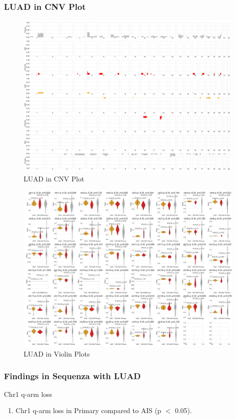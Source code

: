 \documentclass{beamer}
\begin{document}
    \begin{frame}[allowframebreaks]
        \frametitle{LUAD in CNV Plot}

        \begin{figure}
            \includegraphics[width=0.6 \linewidth]{figures/Sequenza/BWA-simple-ADC.pdf}
            \caption{LUAD in CNV Plot}
        \end{figure}

        \begin{figure}
            \includegraphics[width=0.8 \linewidth]{figures/Sequenza/BWA-violin-ADC.pdf}
            \caption{LUAD in Violin Plots}
        \end{figure}
    \end{frame}

    \begin{frame}[allowframebreaks]
        \frametitle{Findings in Sequenza with LUAD}

        \begin{block}{Chr1 q-arm loss}
            \begin{enumerate}
                \item Chr1 q-arm loss in Primary compared to AIS (p $<$ 0.05).
            \end{enumerate}

            \begin{table}
                \caption{CGC Tier1 genes in Chr1 q-arm}
                \resizebox{\linewidth}{!}
                {}
            \end{table}
        \end{block}
    \end{frame}
\end{document}
